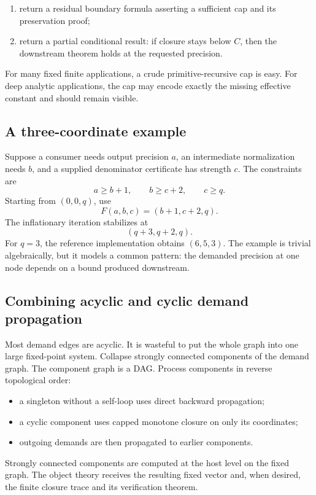 \begin{enumerate}
\item return a residual boundary formula asserting a sufficient cap and its preservation proof;
\item return a partial conditional result: if closure stays below \(C\), then the downstream theorem holds at the requested precision.
\end{enumerate}

For many fixed finite applications, a crude primitive-recursive cap is easy.  For deep analytic applications, the cap may encode exactly the missing effective constant and should remain visible.

\subsection{A three-coordinate example}

Suppose a consumer needs output precision \(a\), an intermediate normalization needs \(b\), and a supplied denominator certificate has strength \(c\).  The constraints are
\[
 a\ge b+1,
 \qquad
 b\ge c+2,
 \qquad
 c\ge q.
\]
Starting from \((0,0,q)\), use
\[
 F(a,b,c)=(b+1,c+2,q).
\]
The inflationary iteration stabilizes at
\[
 (q+3,q+2,q).
\]
For \(q=3\), the reference implementation obtains \((6,5,3)\).  The example is trivial algebraically, but it models a common pattern: the demanded precision at one node depends on a bound produced downstream.

\subsection{Combining acyclic and cyclic demand propagation}

Most demand edges are acyclic.  It is wasteful to put the whole graph into one large fixed-point system.  Collapse strongly connected components of the demand graph.  The component graph is a DAG.  Process components in reverse topological order:

\begin{itemize}
\item a singleton without a self-loop uses direct backward propagation;
\item a cyclic component uses capped monotone closure on only its coordinates;
\item outgoing demands are then propagated to earlier components.
\end{itemize}

Strongly connected components are computed at the host level on the fixed graph.  The object theory receives the resulting fixed vector and, when desired, the finite closure trace and its verification theorem.

